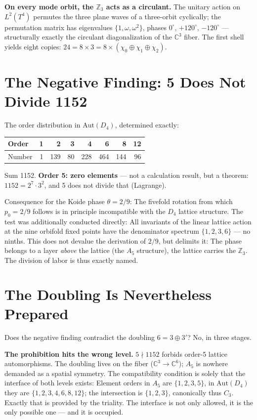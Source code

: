 \textbf{On every mode orbit, the $\mathbb{Z}_3$ acts as a circulant.}
The unitary action on $L^2(T^4)$ permutes the three plane waves
of a three-orbit cyclically; the permutation matrix has eigenvalues
$\{1,\omega,\omega^2\}$, phases $0^\circ$, $+120^\circ$, $-120^\circ$
--- structurally exactly the circulant diagonalization of the
$\mathbb{C}^3$ fiber. The first shell yields eight copies:
$24 = 8\times3 = 8\times(\chi_0\oplus\chi_1\oplus\chi_2)$.

\section{The Negative Finding: 5 Does Not Divide 1152}

The order distribution in $\mathrm{Aut}(D_4)$, determined exactly:
\begin{center}
\small
\begin{tabular}{lrrrrrrr}
\toprule
Order & 1 & 2 & 3 & 4 & 6 & 8 & 12 \\
\midrule
Number & 1 & 139 & 80 & 228 & 464 & 144 & 96 \\
\bottomrule
\end{tabular}
\end{center}
Sum 1152. \textbf{Order 5: zero elements} --- not a calculation result,
but a theorem: $1152 = 2^7\cdot3^2$, and 5 does not divide that
(Lagrange).

Consequence for the Koide phase $\theta = 2/9$: The fivefold rotation from
which $p_0 = 2/9$ follows is in principle incompatible with the $D_4$
lattice structure. The test was additionally conducted directly: All
invariants of the linear lattice action at the nine orbifold fixed points
have the denominator spectrum $\{1,2,3,6\}$ --- no ninths. This does not devalue
the derivation of $2/9$, but delimits it: The phase belongs
to a layer \emph{above} the lattice (the $A_5$ structure), the lattice
carries the $\mathbb{Z}_3$. The division of labor is thus exactly named.

\section{The Doubling Is Nevertheless Prepared}

Does the negative finding contradict the doubling $6 = 3\oplus3'$? No,
in three stages.

\textbf{The prohibition hits the wrong level.} $5\nmid1152$ forbids
order-5 lattice automorphisms. The doubling lives on the fiber
($\mathbb{C}^3\to\mathbb{C}^6$); $A_5$ is nowhere demanded as a spatial symmetry.
The compatibility condition is solely that the
interface of both levels exists: Element orders in $A_5$ are
$\{1,2,3,5\}$, in $\mathrm{Aut}(D_4)$ they are $\{1,2,3,4,6,8,12\}$; the
intersection is $\{1,2,3\}$, canonically thus $C_3$. Exactly that is provided by the
triality. The interface is not only allowed, it is the
only possible one --- and it is occupied.

